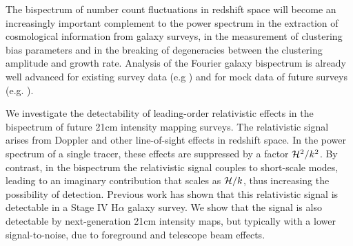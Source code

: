 The bispectrum of number count fluctuations in redshift space will become an increasingly important complement to the power spectrum in the extraction of cosmological information from galaxy surveys, 
{in the measurement of {clustering} bias parameters and in the breaking of degeneracies between the clustering amplitude and growth rate.}
Analysis of the Fourier galaxy bispectrum is already well advanced for existing survey data (e.g \cite{Gil-Marin:2016wya,Sugiyama:2018yzo}) and for mock data of future surveys (e.g. \cite{Karagiannis:2018jdt,Yankelevich:2018uaz,Oddo:2019run,Sugiyama:2019ike}). 

We investigate the detectability of leading-order relativistic effects in the bispectrum of future 21cm intensity  mapping surveys. The relativistic signal arises from Doppler and other line-of-sight effects in redshift space. In the power spectrum of a single tracer, these effects are suppressed by a factor $\mathcal{H}^2/k^2$. By contrast, in the bispectrum the relativistic signal couples to short-scale modes, leading to
an imaginary contribution that scales as $\mathcal{H}/k$, thus increasing the possibility of detection.
Previous work has shown that this relativistic signal is detectable in a Stage IV H$\alpha$ galaxy survey. 
{We show that the signal is also detectable by next-generation  21cm intensity maps, but typically with a lower signal-to-noise, due to foreground and telescope beam effects.}


